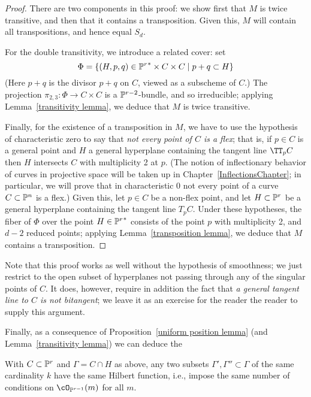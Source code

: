 \begin{proof}
There are two components in this proof: we show first that $M$ is twice transitive, and then that it contains a transposition. Given this, $M$ will contain all transpositions, and hence equal $S_d$.

For the double transitivity, we introduce a related cover: set
$$
\Phi = \{ (H, p, q) \in {\PP^r}^* \times C \times C \mid p + q \subset H \}
$$
(Here $p+q$ is the divisor $p+q$ on $C$, viewed as a subscheme of $C$.) The projection $\pi_{2,3} : \Phi \to C \times C$ is a $\PP^{r-2}$-bundle, and so irreducible; applying Lemma~\ref{transitivity lemma}, we deduce that $M$ is twice transitive.

Finally, for the existence of a transposition in $M$, we have to use the hypothesis of characteristic zero to say that \emph{not every point of $C$ is a flex}; that is, if $p\in C$ is a general point and $H$ a general hyperplane containing the tangent line $\TT_pC$ then $H$ intersects $C$ with multiplicity 2 at $p$. (The notion of inflectionary behavior of curves in projective space will be taken up in Chapter~\ref{InflectionsChapter}; in particular, we will prove that in characteristic 0 not every point of  a curve $C\subset \PP^n$ is a flex.) Given this, let $p \in C$ be a non-flex point, and let $H \subset \PP^r$ be a general hyperplane containing the tangent line $T_pC$. Under these hypotheses, the fiber of $\Phi$ over the point $H \in {\PP^r}^*$ consists of the point $p$ with multiplicity 2, and $d-2$ reduced points; applying Lemma~\ref{transposition lemma}, we deduce that $M$ contains a transposition.
\end{proof}

Note that this proof works as well without the hypothesis of smoothness; we just restrict to the open subset of hyperplanes not passing through any of the singular points of $C$. It does, however, require in addition the fact that \emph{a general tangent line to $C$ is not bitangent}; we leave it as an exercise for the reader the reader to supply this argument.

Finally, as a consequence of Proposition~\ref{uniform position lemma} (and Lemma~\ref{transitivity lemma}) we can deduce the

\begin{lemma}
With $C \subset \PP^r$ and $\Gamma = C \cap H$ as above, any two subsets $\Gamma', \Gamma'' \subset \Gamma$ of the same cardinality $k$ have the same Hilbert function, i.e., impose the same number of conditions on $\cO_{\PP^{r-1}}(m)$ for all $m$.
\end{lemma}

